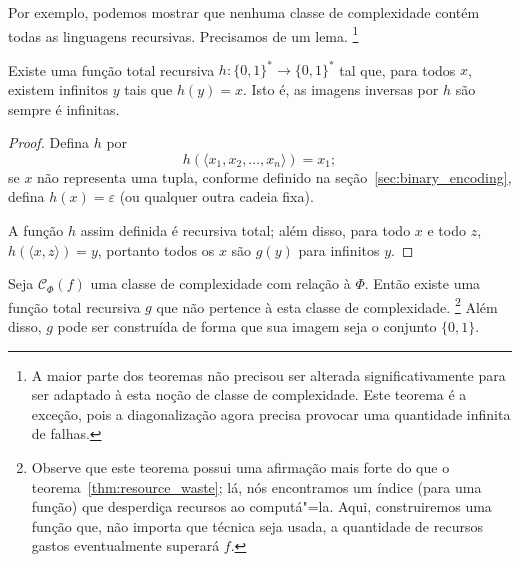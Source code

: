 Por exemplo,
podemos mostrar que
nenhuma classe de complexidade contém todas as linguagens recursivas.
Precisamos de um lema.%
\footnote{
    A maior parte dos teoremas não precisou ser alterada significativamente
    para ser adaptado à esta noção de classe de complexidade.
    Este teorema é a exceção,
    pois a diagonalização agora precisa provocar uma quantidade infinita de falhas.
}

\begin{lemma}
    Existe uma função total recursiva $h: \{0, 1\}^* \to \{0, 1\}^*$
    tal que, para todos $x$,
    existem infinitos $y$ tais que $h(y) = x$.
    Isto é, as imagens inversas por $h$ são sempre é infinitas.
\end{lemma}

\begin{proof}
    Defina $h$ por
    \begin{equation*}
        h( \langle x_1, x_2, \dots, x_n \rangle ) = x_1;
    \end{equation*}
    se $x$ não representa uma tupla,
    conforme definido na seção~\ref{sec:binary_encoding},
    defina $h(x) = \varepsilon$
    (ou qualquer outra cadeia fixa).

    A função $h$ assim definida é recursiva total;
    além disso, para todo $x$ e todo $z$,
    $h(\langle x, z \rangle) = y$,
    portanto todos os $x$ são $g(y)$ para infinitos $y$.
\end{proof}

\begin{theorem}
    Seja $\mathcal C_\Phi(f)$ uma classe de complexidade
    com relação à $\Phi$.
    Então existe uma função total recursiva $g$
    que não pertence à esta classe de complexidade.%
    \footnote{
        Observe que este teorema possui uma afirmação mais forte
        do que o teorema~\ref{thm:resource_waste};
        lá,
        nós encontramos um índice (para uma função)
        que desperdiça recursos ao computá"=la.
        Aqui,
        construiremos uma função que,
        não importa que técnica seja usada,
        a quantidade de recursos gastos eventualmente superará $f$.
    }
    Além disso, $g$ pode ser construída de forma que
    sua imagem seja o conjunto $\{0, 1\}$.
    \label{thm:outside_class}
\end{theorem}

